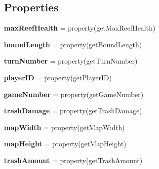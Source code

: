 \subsection*{\-Properties}
\begin{DoxyCompactItemize}
\item 
\hypertarget{classBaseAI_1_1BaseAI_a501c7b0ba77233ac433ef0dc41010dae}{{\bfseries max\-Reef\-Health} = property(get\-Max\-Reef\-Health)}\label{classBaseAI_1_1BaseAI_a501c7b0ba77233ac433ef0dc41010dae}

\item 
\hypertarget{classBaseAI_1_1BaseAI_a2dba4fdc40c7db117419c26b24ddc388}{{\bfseries bound\-Length} = property(get\-Bound\-Length)}\label{classBaseAI_1_1BaseAI_a2dba4fdc40c7db117419c26b24ddc388}

\item 
\hypertarget{classBaseAI_1_1BaseAI_aad7e55e72604dc7e4ec21611668fb15a}{{\bfseries turn\-Number} = property(get\-Turn\-Number)}\label{classBaseAI_1_1BaseAI_aad7e55e72604dc7e4ec21611668fb15a}

\item 
\hypertarget{classBaseAI_1_1BaseAI_a9ca0e2026d5753b11a123cf4463fb01c}{{\bfseries player\-I\-D} = property(get\-Player\-I\-D)}\label{classBaseAI_1_1BaseAI_a9ca0e2026d5753b11a123cf4463fb01c}

\item 
\hypertarget{classBaseAI_1_1BaseAI_a29d9dfbe07078a57a350f788a3640ccc}{{\bfseries game\-Number} = property(get\-Game\-Number)}\label{classBaseAI_1_1BaseAI_a29d9dfbe07078a57a350f788a3640ccc}

\item 
\hypertarget{classBaseAI_1_1BaseAI_a110d5b278fc2890a471553995fd79a1d}{{\bfseries trash\-Damage} = property(get\-Trash\-Damage)}\label{classBaseAI_1_1BaseAI_a110d5b278fc2890a471553995fd79a1d}

\item 
\hypertarget{classBaseAI_1_1BaseAI_af20b4fe9a0c9c96f0dae7db51f5bfcfe}{{\bfseries map\-Width} = property(get\-Map\-Width)}\label{classBaseAI_1_1BaseAI_af20b4fe9a0c9c96f0dae7db51f5bfcfe}

\item 
\hypertarget{classBaseAI_1_1BaseAI_a33210a162a644079740c00388fb69f42}{{\bfseries map\-Height} = property(get\-Map\-Height)}\label{classBaseAI_1_1BaseAI_a33210a162a644079740c00388fb69f42}

\item 
\hypertarget{classBaseAI_1_1BaseAI_a530f0b40196d02ddca435837c2f8ed90}{{\bfseries trash\-Amount} = property(get\-Trash\-Amount)}\label{classBaseAI_1_1BaseAI_a530f0b40196d02ddca435837c2f8ed90}


\end{DoxyCompactItemize}
